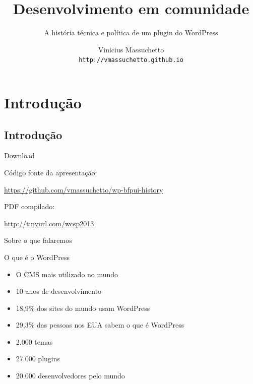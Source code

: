 \documentclass{beamer}
\title{Desenvolvimento em comunidade}
\subtitle{A história técnica e política de um plugin do WordPress}
\author{Vinicius Massuchetto \\ \texttt{http://vmassuchetto.github.io}}
\date{}
\begin{document}
\frame{\titlepage}

\section{Introdução}
\subsection{Introdução}

\begin{frame}{Download}
\begin{center}

  Código fonte da apresentação:

  \vspace{0.1cm}

  \url{https://github.com/vmassuchetto/wp-bfpui-history}

  \vspace{0.5cm}

  PDF compilado:

  \vspace{0.1cm}

  \url{http://tinyurl.com/wcsp2013}

\end{center}
\end{frame}

\begin{frame}{Sobre o que falaremos}
  \tableofcontents[subsectionstyle=hide]
\end{frame}

\begin{frame}{O que é o WordPress}
\begin{itemize}
  \pause \item O CMS mais utilizado no mundo
  \pause \item 10 anos de desenvolvimento
  \pause \item 18,9\% dos sites do mundo usam WordPress
  \pause \item 29,3\% das pessoas nos EUA sabem o que é WordPress
  \pause \item 2.000 temas
  \pause \item 27.000 plugins
  \pause \item 20.000 desenvolvedores pelo mundo
\end{itemize}
\end{frame}
\end{document}
